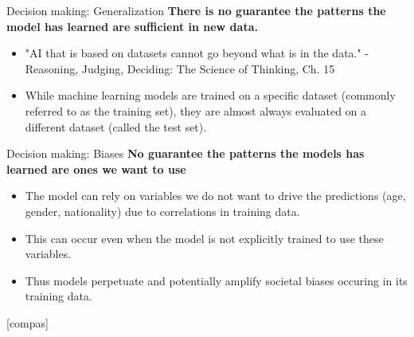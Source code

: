\documentclass[8pt]{beamer}
\begin{document}
	\begin{frame}[t]{Decision making: Generalization} %
		\centering
		\textbf{There is no guarantee the patterns the model has learned are sufficient in new data.}
		\begin{itemize}
			\item "AI that is based on datasets cannot go beyond what is in the data." - Reasoning, Judging, Deciding: The Science of Thinking, Ch. 15
			\item While machine learning models are trained on a specific dataset (commonly referred to as the training set), they are almost always evaluated on a different dataset (called the test set).
		\end{itemize}
		\vspace{0.5cm}
	\end{frame}

	\begin{frame}[t]{Decision making: Biases} %
		\textbf{No guarantee the patterns the models has learned are ones we want to use}
		\begin{itemize}
			\item The model can rely on variables we do not want to drive the predictions (age, gender, nationality) due to correlations in training data.
			\item This can occur even when the model is not explicitly trained to use these variables.
			\item Thus models perpetuate and potentially amplify societal biases occuring in its training data.
		\end{itemize}
	\end{frame}

	[compas]
\end{document}
